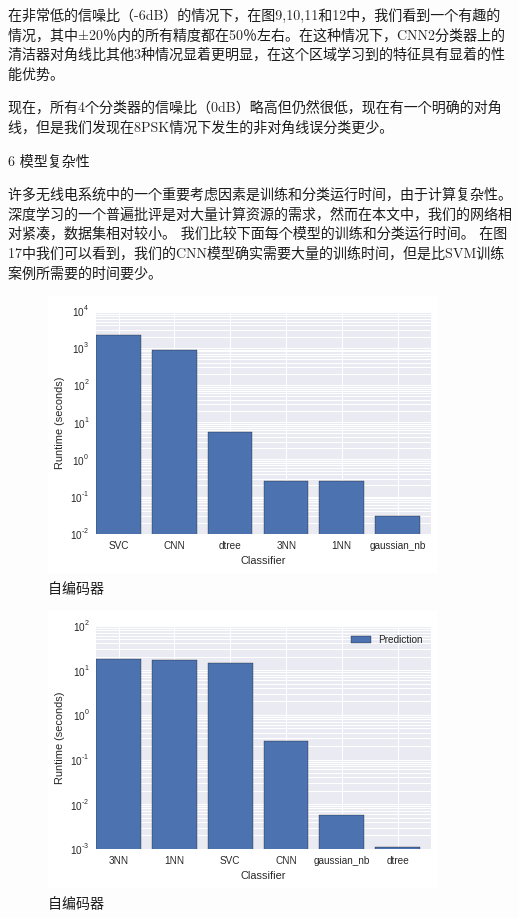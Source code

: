 在非常低的信噪比（-6dB）的情况下，在图9,10,11和12中，我们看到一个有趣的情况，其中±20％内的所有精度都在50％左右。在这种情况下，CNN2分类器上的清洁器对角线比其他3种情况显着更明显，在这个区域学习到的特征具有显着的性能优势。\par

现在，所有4个分类器的信噪比（0dB）略高但仍然很低，现在有一个明确的对角线，但是我们发现在8PSK情况下发生的非对角线误分类更少。\par

6 模型复杂性\par

许多无线电系统中的一个重要考虑因素是训练和分类运行时间，由于计算复杂性。 深度学习的一个普遍批评是对大量计算资源的需求，然而在本文中，我们的网络相对紧凑，数据集相对较小。 我们比较下面每个模型的训练和分类运行时间。 在图17中我们可以看到，我们的CNN模型确实需要大量的训练时间，但是比SVM训练案例所需要的时间要少。\par
\begin{figure}[!h]
	\centering
	\includegraphics[scale=0.5]{figures/chapter_3/train_time}
	\caption{自编码器}	\label{fig_3_2}
\end{figure}
\begin{figure}[!h]
	\centering
	\includegraphics[scale=0.5]{figures/chapter_3/classify_time}
	\caption{自编码器}	\label{fig_3_2}
\end{figure}

